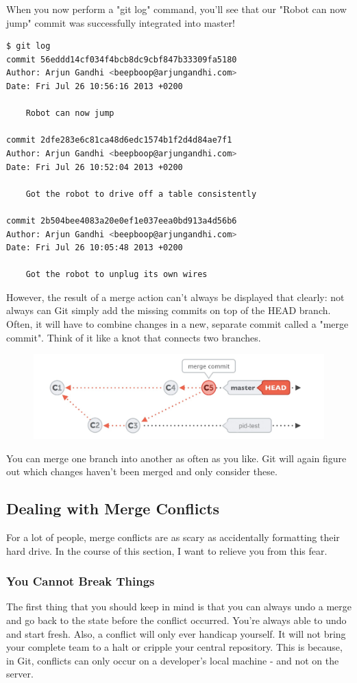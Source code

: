 \documentclass{article}
\begin{document}
When you now perform a "git log" command, you'll see that our "Robot can now jump" commit was successfully integrated into master!

\begin{lstlisting}[language=bash]
$ git log
commit 56eddd14cf034f4bcb8dc9cbf847b33309fa5180
Author: Arjun Gandhi <beepboop@arjungandhi.com>
Date: Fri Jul 26 10:56:16 2013 +0200

    Robot can now jump

commit 2dfe283e6c81ca48d6edc1574b1f2d4d84ae7f1
Author: Arjun Gandhi <beepboop@arjungandhi.com>
Date: Fri Jul 26 10:52:04 2013 +0200

    Got the robot to drive off a table consistently

commit 2b504bee4083a20e0ef1e037eea0bd913a4d56b6
Author: Arjun Gandhi <beepboop@arjungandhi.com>
Date: Fri Jul 26 10:05:48 2013 +0200

    Got the robot to unplug its own wires
\end{lstlisting}

However, the result of a merge action can't always be displayed that clearly: not always can Git simply add the missing commits on top of the HEAD branch. Often, it will have to combine changes in a new, separate commit called a "merge commit". Think of it like a knot that connects two branches.
\begin{figure}[h]
    \centering
    \includegraphics[width=4.5in]{images/merge-commit.jpg}
\end{figure}
\newpage
You can merge one branch into another as often as you like. Git will again figure out which changes haven't been merged and only consider these.

\subsection{Dealing with Merge Conflicts}
For a lot of people, merge conflicts are as scary as accidentally formatting their hard drive. In the course of this section, I want to relieve you from this fear.
\subsubsection{You Cannot Break Things}
The first thing that you should keep in mind is that you can always undo a merge and go back to the state before the conflict occurred. You're always able to undo and start fresh.
\newline\newline
Also, a conflict will only ever handicap yourself. It will not bring your complete team to a halt or cripple your central repository. This is because, in Git, conflicts can only occur on a developer's local machine - and not on the server.
\end{document}
